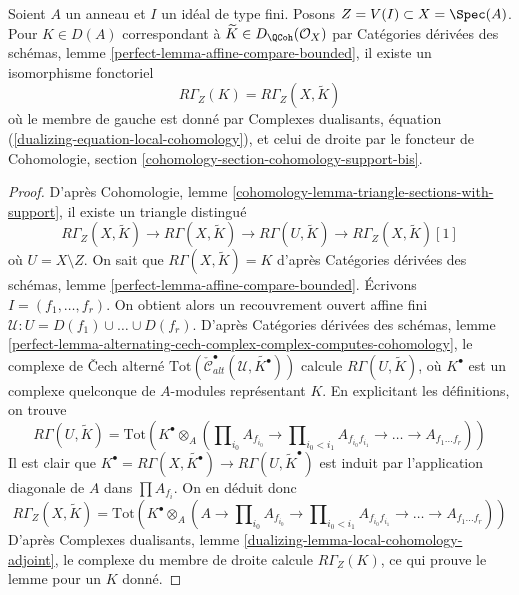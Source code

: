 \begin{lemma}
\label{lemma-local-cohomology-is-local-cohomology}
Soient $A$ un anneau et $I$ un idéal de type fini. Posons $Z = V(I) \subset X = \Spec(A)$. Pour $K \in D(A)$ correspondant à $\widetilde{K} \in D_\QCoh(\mathcal{O}_X)$ par Catégories dérivées des schémas, lemme \ref{perfect-lemma-affine-compare-bounded}, il existe un isomorphisme fonctoriel
$$
R\Gamma_Z(K) = R\Gamma_Z(X, \widetilde{K})
$$
où le membre de gauche est donné par Complexes dualisants, équation (\ref{dualizing-equation-local-cohomology}), et celui de droite par le foncteur de Cohomologie, section \ref{cohomology-section-cohomology-support-bis}.
\end{lemma}

\begin{proof}
D'après Cohomologie, lemme \ref{cohomology-lemma-triangle-sections-with-support}, il existe un triangle distingué
$$
R\Gamma_Z(X, \widetilde{K})
\to R\Gamma(X, \widetilde{K})
\to R\Gamma(U, \widetilde{K})
\to R\Gamma_Z(X, \widetilde{K})[1]
$$
où $U = X \setminus Z$. On sait que $R\Gamma(X, \widetilde{K}) = K$ d'après Catégories dérivées des schémas, lemme \ref{perfect-lemma-affine-compare-bounded}. Écrivons $I = (f_1, \ldots, f_r)$. On obtient alors un recouvrement ouvert affine fini $\mathcal{U} : U = D(f_1) \cup \ldots \cup D(f_r)$. D'après Catégories dérivées des schémas, lemme \ref{perfect-lemma-alternating-cech-complex-complex-computes-cohomology}, le complexe de {\v C}ech alterné $\text{Tot}(\check{\mathcal{C}}_{alt}^\bullet(\mathcal{U},
\widetilde{K^\bullet}))$ calcule $R\Gamma(U, \widetilde{K})$, où $K^\bullet$ est un complexe quelconque de $A$-modules représentant $K$. En explicitant les définitions, on trouve
$$
R\Gamma(U, \widetilde{K}) =
\text{Tot}\left(
K^\bullet \otimes_A
(\prod\nolimits_{i_0} A_{f_{i_0}} \to
\prod\nolimits_{i_0 < i_1} A_{f_{i_0}f_{i_1}} \to
\ldots \to A_{f_1\ldots f_r})\right)
$$
Il est clair que $K^\bullet = R\Gamma(X, \widetilde{K^\bullet}) \to
R\Gamma(U, \widetilde{K}^\bullet)$ est induit par l'application diagonale de $A$ dans $\prod A_{f_i}$. On en déduit donc
$$
R\Gamma_Z(X, \widetilde{K}) =
\text{Tot}\left(
K^\bullet \otimes_A
(A \to \prod\nolimits_{i_0} A_{f_{i_0}} \to
\prod\nolimits_{i_0 < i_1} A_{f_{i_0}f_{i_1}} \to
\ldots \to A_{f_1\ldots f_r})\right)
$$
D'après Complexes dualisants, lemme \ref{dualizing-lemma-local-cohomology-adjoint}, le complexe du membre de droite calcule $R\Gamma_Z(K)$, ce qui prouve le lemme pour un $K$ donné.


\end{proof}
